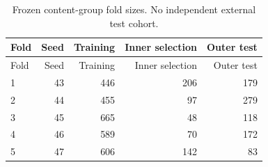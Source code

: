 \small
\begin{longtable}{lrrrr}
\caption{Frozen content-group fold sizes. No independent external test cohort.}\\
\toprule
Fold & Seed & Training & Inner selection & Outer test\\\midrule
\endfirsthead
\toprule
Fold & Seed & Training & Inner selection & Outer test\\\midrule
\endhead
1 & 43 & 446 & 206 & 179\\
2 & 44 & 455 & 97 & 279\\
3 & 45 & 665 & 48 & 118\\
4 & 46 & 589 & 70 & 172\\
5 & 47 & 606 & 142 & 83\\
\bottomrule\end{longtable}\normalsize
